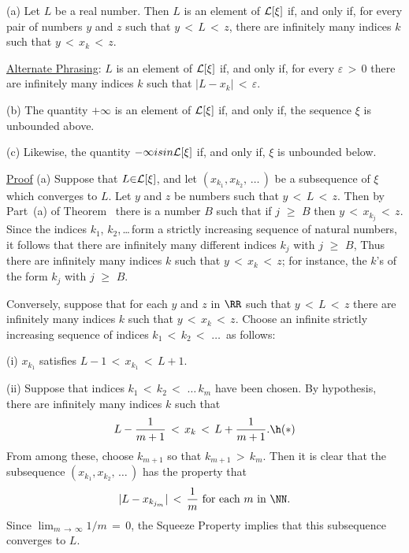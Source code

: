 \V

        (a) Let $L$ be a real number. Then $L$ is an element of ${\cal L}[{\xi}]$ if, and only if, for every pair of numbers $y$ and $z$ such that $y\,<\,L\,<\,z$, there are infinitely many indices $k$ such that $y\,<\,x_{k}\,<\,z$.

        \underline{Alternate Phrasing}: $L$ is an element of ${\cal L}[{\xi}]$ if, and only if, for every ${\varepsilon}\,>\,0$ there are infinitely many indices $k$ such that $|L-x_{k}|\,<\,{\varepsilon}$.

\V

        (b) The quantity $+{\infty}$ is an element of ${\cal L}[{\xi}]$ if, and only if, the sequence ${\xi}$ is unbounded above.


\V
        (c) Likewise, the quantity $-{\infty} is in {\cal L}[{\xi}]$ if, and only if, ${\xi}$ is unbounded below.


\V

        \underline{Proof} (a) Suppose that $L{\in}{\cal L}[{\xi}]$, and let $(x_{k_{1}},x_{k_{2}},\,{\ldots}\,)$ be a subsequence of ${\xi}$ which converges to $L$.
    Let $y$ and $z$ be numbers such that $y\,<\,L\,<\,z$. Then by Part~(a) of Theorem~ there is a number $B$ such that if $j\,\,{\geq}\,\,B$ then $y\,<\,x_{k_{j}}\,<\,z$.
    Since the indices $k_{1}$, $k_{2}$,\,{\ldots}\,form a strictly increasing sequence of natural numbers, it follows that there are infinitely many different indices $k_{j}$ with $j\,\,{\geq}\,\,B$,
    Thus there are infinitely many indices $k$ such that $y\,<\,x_{k}\,<\,z$; for instance, the $k$'s of the form $k_{j}$ with $j\,\,{\geq}\,\,B$.

        Conversely, suppose that for each $y$ and $z$ in ${\RR}$ such that $y\,<\,L\,<\,z$ there are infinitely many indices $k$ such that $y\,<\,x_{k}\,<\,z$.
    Choose an infinite strictly increasing sequence of indices $k_{1}\,<\,k_{2}\,<\,\,{\ldots}\,$ as follows:

        (i) $x_{k_{1}}$ satisfies $L-1\,<\,x_{k_{1}}\,<\,L+1$.

        (ii) Suppose that indices $k_{1}\,<\,k_{2}\,<\,\,{\ldots}\,k_{m}$ have been chosen. By hypothesis, there are infinitely many indices $k$ such that
        \begin{displaymath}
        L-\frac{1}{m+1}\,<\,x_{k}\,<\,L+\frac{1}{m+1}. \h ({\ast})
        \end{displaymath}
    From among these, choose $k_{m+1}$ so that $k_{m+1}\,>\,k_{m}$.
    Then it is clear that the subsequence $(x_{k_{1}},x_{k_{2}},\,{\ldots}\,)$ has the property that
        \begin{displaymath}
        |L-x_{k_{j_{m}}}|\,<\,\frac{1}{m} \mbox{ for each $m$ in ${\NN}$}.
        \end{displaymath}
    Since $\lim_{m \,{\rightarrow}\, {\infty}} 1/m \,=\, 0$, the Squeeze Property implies that this subsequence converges to $L$.

